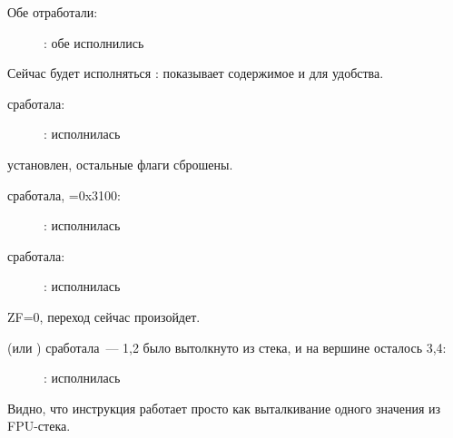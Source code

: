 ﻿\clearpage
{}
\myindex{\olly}

Обе \FLD отработали:

\begin{figure}[H]
\centering
{}
\caption{\olly: обе \FLD исполнились}
\label{fig:FPU_comparison_Ox_case1_olly1}
\end{figure}

Сейчас будет исполняться \FCOM: 
\olly показывает содержимое  и  для удобства.

\clearpage
\FCOM сработала:

\begin{figure}[H]
\centering
{}
\caption{\olly: \FCOM исполнилась}
\label{fig:FPU_comparison_Ox_case1_olly2}
\end{figure}

\Czero установлен, остальные флаги сброшены.

\clearpage
\FNSTSW сработала, =0x3100:

\begin{figure}[H]
\centering
{}
\caption{\olly: \FNSTSW исполнилась}
\label{fig:FPU_comparison_Ox_case1_olly3}
\end{figure}

\clearpage
\TEST сработала:

\begin{figure}[H]
\centering
{}
\caption{\olly: \TEST исполнилась}
\label{fig:FPU_comparison_Ox_case1_olly4}
\end{figure}

ZF=0, переход сейчас произойдет.

\clearpage
{} (или \FSTP {}) сработала~--- 1,2 было вытолкнуто из стека, и на вершине осталось 3,4:

\begin{figure}[H]
\centering
{}
\caption{\olly: \FSTP исполнилась}
\label{fig:FPU_comparison_Ox_case1_olly5}
\end{figure}

Видно, что инструкция  работает просто как выталкивание одного значения из FPU-стека.

\clearpage
{}

